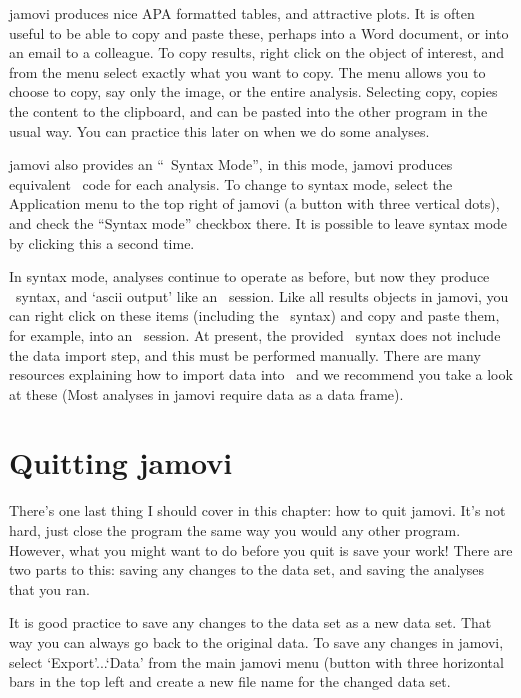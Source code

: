 
jamovi produces nice APA formatted tables, and attractive plots. It is often useful to be able to copy and paste these, perhaps into a Word document, or into an email to a colleague. To copy results, right click on the object of interest, and from the menu select exactly what you want to copy. The menu allows you to choose to copy, say only the image, or the entire analysis. Selecting copy, copies the content to the clipboard, and can be pasted into the other program in the usual way. You can practice this later on when we do some analyses.


jamovi also provides an “\R\ Syntax Mode”, in this mode, jamovi produces equivalent \R\ code for each analysis. To change to syntax mode, select the Application menu to the top right of jamovi (a button with three vertical dots), and check the “Syntax mode” checkbox there. It is possible to leave syntax mode by clicking this a second time.

In syntax mode, analyses continue to operate as before, but now they produce \R\ syntax, and ‘ascii output’ like an \R\ session. Like all results objects in jamovi, you can right click on these items (including the \R\ syntax) and copy and paste them, for example, into an \R\ session. At present, the provided \R\ syntax does not include the data import step, and this must be performed manually. There are many resources explaining how to import data into \R\, and we recommend you take a look at these (Most analyses in jamovi require data as a data frame).

\section{Quitting jamovi \label{sec:quittingjamovi}}


There's one last thing I should cover in this chapter: how to quit jamovi. It's not hard, just close the program the same way you would any other program. However, what you might want to do before you quit is save your work! There are two parts to this: saving any changes to the data set, and saving the analyses that you ran.

It is good practice to save any changes to the data set as a new data set. That way you can always go back to the original data. To save any changes in jamovi, select `Export'...`Data' from the main jamovi menu (button with three horizontal bars in the top left and create a new file name for the changed data set.

